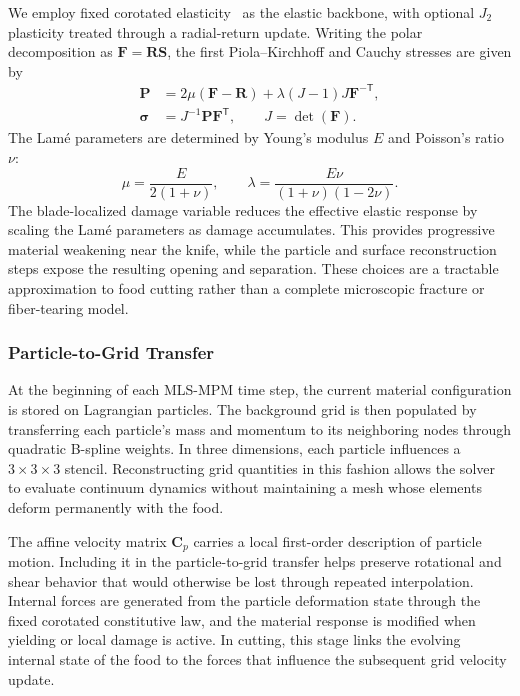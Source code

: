 We employ fixed corotated elasticity~\citep{stomakhin2012energetically} as the elastic backbone, with optional $J_2$ plasticity treated through a radial-return update. Writing the polar decomposition as $\mathbf{F}=\mathbf{R}\mathbf{S}$, the first Piola--Kirchhoff and Cauchy stresses are given by
\begin{subequations}\label{eq:corot_simple}
\begin{align}
  \mathbf{P} &= 2\mu(\mathbf{F}-\mathbf{R})
    +\lambda(J-1)J\mathbf{F}^{-\mathsf{T}},\\
  \boldsymbol{\sigma} &= J^{-1}\mathbf{P}\mathbf{F}^{\mathsf{T}},
  \qquad J=\det(\mathbf{F}).
\end{align}
\end{subequations}
The Lam\'e parameters are determined by Young's modulus $E$ and Poisson's ratio $\nu$:
\begin{equation}\label{eq:lame}
  \mu=\frac{E}{2(1+\nu)},\qquad
  \lambda=\frac{E\nu}{(1+\nu)(1-2\nu)}.
\end{equation}
The blade-localized damage variable reduces the effective elastic response by scaling the Lam\'e parameters as damage accumulates. This provides progressive material weakening near the knife, while the particle and surface reconstruction steps expose the resulting opening and separation. These choices are a tractable approximation to food cutting rather than a complete microscopic fracture or fiber-tearing model.

\subsubsection{Particle-to-Grid Transfer}
At the beginning of each MLS-MPM time step, the current material configuration is stored on Lagrangian particles. The background grid is then populated by transferring each particle's mass and momentum to its neighboring nodes through quadratic B-spline weights. In three dimensions, each particle influences a $3\times3\times3$ stencil. Reconstructing grid quantities in this fashion allows the solver to evaluate continuum dynamics without maintaining a mesh whose elements deform permanently with the food.

The affine velocity matrix $\mathbf{C}_p$ carries a local first-order description of particle motion. Including it in the particle-to-grid transfer helps preserve rotational and shear behavior that would otherwise be lost through repeated interpolation. Internal forces are generated from the particle deformation state through the fixed corotated constitutive law, and the material response is modified when yielding or local damage is active. In cutting, this stage links the evolving internal state of the food to the forces that influence the subsequent grid velocity update.

